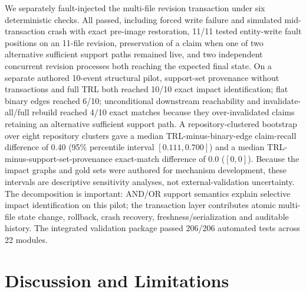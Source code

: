 \documentclass[journal]{IEEEtran}
\begin{document}
We separately fault-injected the multi-file revision transaction under six deterministic checks. All passed, including forced write failure and simulated mid-transaction crash with exact pre-image restoration, 11/11 tested entity-write fault positions on an 11-file revision, preservation of a claim when one of two alternative sufficient support paths remained live, and two independent concurrent revision processes both reaching the expected final state. On a separate authored 10-event structural pilot, support-set provenance without transactions and full TRL both reached 10/10 exact impact identification; flat binary edges reached 6/10; unconditional downstream reachability and invalidate-all/full rebuild reached 4/10 exact matches because they over-invalidated claims retaining an alternative sufficient support path. A repository-clustered bootstrap over eight repository clusters gave a median TRL-minus-binary-edge claim-recall difference of 0.40 (95\% percentile interval $[0.111,0.700]$) and a median TRL-minus-support-set-provenance exact-match difference of 0.0 ($[0,0]$). Because the impact graphs and gold sets were authored for mechanism development, these intervals are descriptive sensitivity analyses, not external-validation uncertainty. The decomposition is important: AND/OR support semantics explain selective impact identification on this pilot; the transaction layer contributes atomic multi-file state change, rollback, crash recovery, freshness/serialization and auditable history. The integrated validation package passed 206/206 automated tests across 22 modules.

\section{Discussion and Limitations}
\label{sec:discussion}
\end{document}
